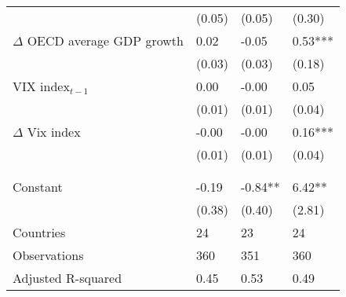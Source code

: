 {\begin{tabular}{lp{3cm}p{3cm}p{3cm}}
   & (0.05) & (0.05) & (0.30) \\ 
  $\Delta$ OECD average GDP growth & 0.02 & -0.05 & 0.53*** \\ 
   & (0.03) & (0.03) & (0.18) \\ 
  VIX index$_{t-1}$ & 0.00 & -0.00 & 0.05 \\ 
   & (0.01) & (0.01) & (0.04) \\ 
  $\Delta$ Vix index & -0.00 & -0.00 & 0.16*** \\ 
   & (0.01) & (0.01) & (0.04) \\ 
   &  &  &  \\ 
   &  &  &  \\ 
  Constant & -0.19 & -0.84** & 6.42** \\ 
   & (0.38) & (0.40) & (2.81) \\ 
  Countries & 24 & 23 & 24 \\ 
  Observations & 360 & 351 & 360 \\ 
  Adjusted R-squared & 0.45 & 0.53 & 0.49 \\ 
   \hline
\end{tabular}
}
